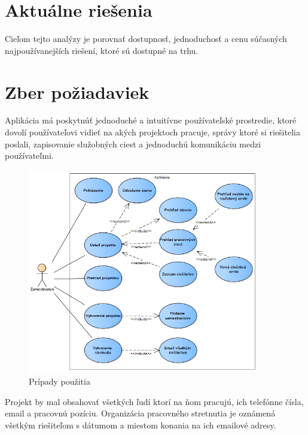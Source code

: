  
\section{Aktuálne riešenia}
Cieľom tejto analýzy je porovnať dostupnosť, jednoduchosť a cenu súčasných najpoužívanejších riešení, ktoré sú dostupné na trhu.

  
  
  
\section{Zber požiadaviek}

Aplikácia má poskytnúť jednoduché a intuitívne používateľské prostredie, ktoré dovolí používateľovi vidieť na akých projektoch pracuje, správy ktoré si riešitelia poslali, zapisovanie služobných ciest a jednoduchú komunikáciu medzi používateľmi. 

\begin{figure}[H]
    \begin{center}
        \begin{minipage}{0.9\linewidth}
            \begin{center}
                \includegraphics[width=0.9\textwidth]{images/usecase.png}
                \caption{Prípady použitia }
                \label{obr2.1}
            \end{center}
        \end{minipage}
    \end{center}
\end{figure}

Projekt by mal obsahovať všetkých ľudí ktorí na ňom pracujú, ich telefónne čísla, email a pracovnú pozíciu. Organizácia pracovného stretnutia je oznámená všetkým riešiteľom s dátumom a miestom konania na ich emailové adresy. 



